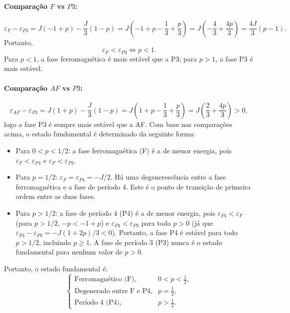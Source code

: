\documentclass[11pt,a4paper]{article}
\begin{document}
\begin{itemize}
\paragraph{Comparação \(F\) vs \(P3\):}
\[
\varepsilon_F - \varepsilon_{P3} = J(-1+p) - \frac{J}{3}(1-p)
= J\left( -1 + p - \frac{1}{3} + \frac{p}{3} \right)
= J\left( -\frac{4}{3} + \frac{4p}{3} \right)
= \frac{4J}{3}(p - 1).
\]
%
Portanto,
%
\[
\varepsilon_F < \varepsilon_{P3} \iff p < 1.
\]
%
Para \(p < 1\), a fase ferromagnética é mais estável que a P3; para \(p > 1\), a fase P3 é mais estável.
%
\paragraph{Comparação \(AF\) vs \(P3\):}
%
\[
\varepsilon_{AF} - \varepsilon_{P3} = J(1+p) - \frac{J}{3}(1-p)
= J\left( 1 + p - \frac{1}{3} + \frac{p}{3} \right)
= J\left( \frac{2}{3} + \frac{4p}{3} \right) > 0,
\]
%
logo a fase P3 é sempre mais estável que a AF.
%
Com base nas comparações acima, o estado fundamental é determinado da seguinte forma:
%
\begin{itemize}
    \item Para \(0 < p < 1/2\): a fase ferromagnética (F) é a de menor energia, pois \(\varepsilon_F < \varepsilon_{P4}\) e \(\varepsilon_F < \varepsilon_{P3}\).
    \item Para \(p = 1/2\): \(\varepsilon_F = \varepsilon_{P4} = -J/2\). Há uma degenerescência entre a fase ferromagnética e a fase de período 4. Este é o ponto de transição de primeira ordem entre as duas fases.
    \item Para \(p > 1/2\): a fase de período 4 (P4) é a de menor energia, pois \(\varepsilon_{P4} < \varepsilon_F\) (para \(p > 1/2\), \(-p < -1 + p\)) e \(\varepsilon_{P4} < \varepsilon_{P3}\) para todo \(p > 0\) (já que \(\varepsilon_{P4} - \varepsilon_{P3} = -J(1+2p)/3 < 0\)). Portanto, a fase P4 é estável para todo \(p > 1/2\), incluindo \(p \ge 1\). A fase de período 3 (P3) nunca é o estado fundamental para nenhum valor de \(p > 0\).
\end{itemize}
%
\end{itemize}
%
Portanto, o estado fundamental é:
%
\begin{equation}
    \boxed{
    \begin{cases}
        \text{Ferromagnético (F)}, & 0 < p < \frac{1}{2}, \\[4pt]
        \text{Degenerado entre F e P4}, & p = \frac{1}{2}, \\[4pt]
        \text{Período 4 (P4)}, & p > \frac{1}{2}.
    \end{cases}
    }
    \label{eq:gs_annni}
\end{equation}
\end{document}
